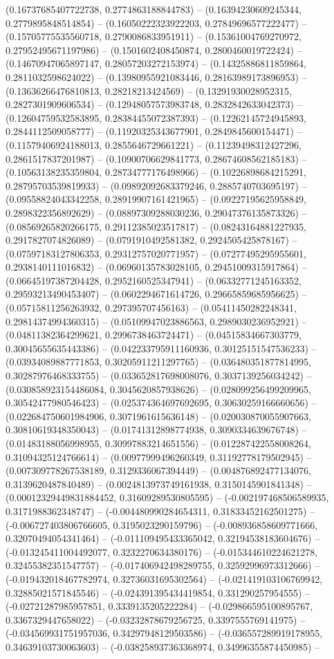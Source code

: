 (0.16737685407722738, 0.2774863188844783) -- (0.16394230609245344, 0.2779895848514854) -- (0.16050222323922203, 0.27849696577222477) -- (0.15705775535560718, 0.2790086833951911) -- (0.15361004769270972, 0.27952495671197986) -- (0.1501602408450874, 0.2800460019722424) -- (0.14670947065897147, 0.28057203272153974) -- (0.14325886811859864, 0.2811032598624022) -- (0.13980955921083446, 0.28163989173896953) -- (0.13636266476810813, 0.28218213424569) -- (0.13291930028952315, 0.2827301909606534) -- (0.12948057573983748, 0.2832842633042373) -- (0.12604759532583895, 0.28384455072387393) -- (0.12262145724945893, 0.2844112509058777) -- (0.11920325343677901, 0.2849845600154471) -- (0.11579406924188013, 0.2855646729661221) -- (0.11239498312427296, 0.2861517837201987) -- (0.10900706629841773, 0.28674608562185183) -- (0.10563138235359804, 0.28734777176498966) -- (0.10226898684215291, 0.28795703539819933) -- (0.09892092683379246, 0.2885740703695197) -- (0.09558824043342258, 0.28919907161421965) -- (0.09227195625958849, 0.2898322356892629) -- (0.08897309288030236, 0.29047376135873326) -- (0.08569265820266175, 0.29112385023517817) -- (0.08243164881227935, 0.2917827074826089) -- (0.0791910492581382, 0.2924505425878167) -- (0.07597183127806353, 0.29312757020771957) -- (0.07277495295955601, 0.2938140111016832) -- (0.06960135783028105, 0.29451009315917864) -- (0.06645197387204428, 0.2952160525347941) -- (0.06332771245163352, 0.29593213490453407) -- (0.0602294671614726, 0.29665859685956625) -- (0.05715811256263932, 0.297395707456163) -- (0.05411450282248341, 0.29814374994360315) -- (0.05109947023886563, 0.2989030236952921) -- (0.04811382364299621, 0.2996738463724471) -- (0.04515834667303779, 0.30045655635443386) -- (0.042233795911160936, 0.30125151547536233) -- (0.03934089887771853, 0.30205911211297765) -- (0.036480351877814995, 0.30287976468333755) -- (0.033652817698008076, 0.3037139256034242) -- (0.030858923154486084, 0.3045620857938626) -- (0.028099256499209965, 0.30542477980546423) -- (0.025374364697692695, 0.30630259166660656) -- (0.022684750601984906, 0.3071961615636148) -- (0.020030870055907663, 0.30810619348350043) -- (0.01741312898774938, 0.3090334639676748) -- (0.01483188056998955, 0.30997883214651556) -- (0.012287422558008264, 0.31094325124766614) -- (0.00977999496260349, 0.31192778179502945) -- (0.007309778267538189, 0.3129336067394449) -- (0.004876892477134076, 0.3139620487840489) -- (0.0024813973749161938, 0.3150145901841348) -- (0.00012329449831884452, 0.31609289530805595) -- (-0.002197468506589935, 0.3171988362348747) -- (-0.004480990284654311, 0.31833452162501275) -- (-0.006727403806766605, 0.3195023290159796) -- (-0.008936858609771666, 0.32070494054341464) -- (-0.011109495433365042, 0.32194538183604676) -- (-0.013245411004492077, 0.3232270634380176) -- (-0.015344610224621278, 0.32455382351547757) -- (-0.017406942498289755, 0.32592996973312666) -- (-0.019432018467782974, 0.32736031695302564) -- (-0.021419103106769942, 0.32885021571845546) -- (-0.024391395434419854, 0.331290257954555) -- (-0.02721287985957851, 0.3339135205222284) -- (-0.029866595100895767, 0.3367329447658022) -- (-0.03232878679256725, 0.3397555769141975) -- (-0.034569931751957036, 0.34297948129503586) -- (-0.036557289919178955, 0.34639103730063603) -- (-0.038258937363368974, 0.34996355874450985) -- 